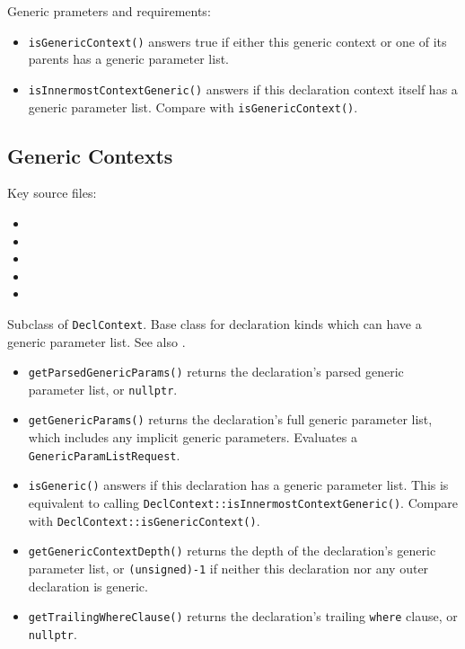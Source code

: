 \documentclass[../generics]{subfiles}
\begin{document}
Generic prameters and requirements:
\begin{itemize}
\item \texttt{isGenericContext()} answers true if either this generic context or one of its parents has a generic parameter list.
\item \texttt{isInnermostContextGeneric()} answers if this declaration context itself has a generic parameter list. Compare with \texttt{isGenericContext()}.
\end{itemize}

\subsection*{Generic Contexts}

Key source files:
\begin{itemize}
\item {}
\item {}
\item {}
\item {}
\item {}
\end{itemize}

Subclass of \texttt{DeclContext}. Base class for declaration kinds which can have a generic parameter list. See also .
\begin{itemize}
\item \texttt{getParsedGenericParams()} returns the declaration's parsed generic parameter list, or \texttt{nullptr}.
\item \texttt{getGenericParams()} returns the declaration's full generic parameter list, which includes any implicit generic parameters. Evaluates a \texttt{GenericParamListRequest}.
\item \texttt{isGeneric()} answers if this declaration has a generic parameter list. This is equivalent to calling \texttt{DeclContext::isInnermostContextGeneric()}. Compare with \texttt{DeclContext::isGenericContext()}.
\item \texttt{getGenericContextDepth()} returns the depth of the declaration's generic parameter list, or \texttt{(unsigned)-1} if neither this declaration nor any outer declaration is generic.
\item \texttt{getTrailingWhereClause()} returns the declaration's trailing \texttt{where} clause, or \texttt{nullptr}.
\end{itemize}
\end{document}
